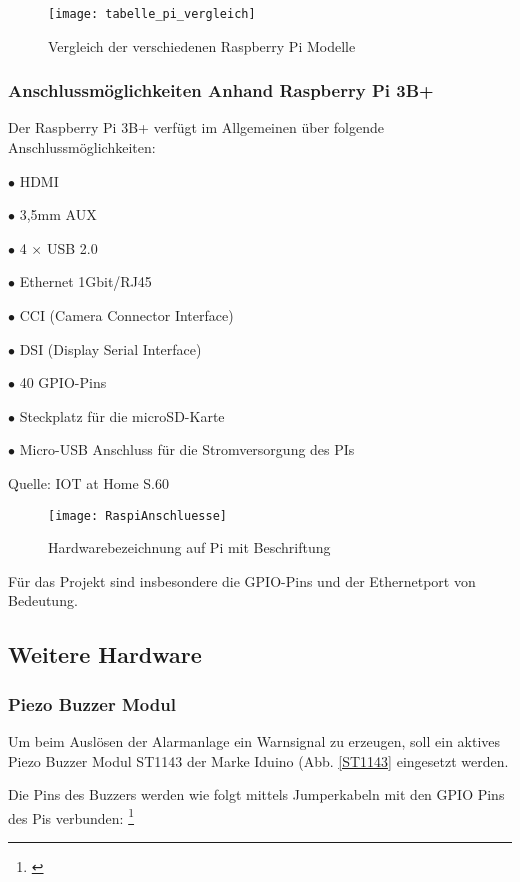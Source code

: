 \documentclass[a4paper,12pt]{article}
\begin{document}
	\begin{figure}[H]
	\centering
	\texttt{[image: tabelle\_pi\_vergleich]}
	\caption{Vergleich der verschiedenen Raspberry Pi Modelle \protect\cite[S. 59]{Huwe.2019}}
	\label{tabelle_pi_vergleich}
\end{figure}


\subsubsection{Anschlussmöglichkeiten Anhand Raspberry Pi 3B+}
Der Raspberry Pi 3B+ verfügt im Allgemeinen über folgende Anschlussmöglichkeiten:\par 
$\bullet$ HDMI   \par %
$\bullet$ 3,5mm AUX\par 
$\bullet$ 4 $\times$ USB 2.0 \par 
$\bullet$ Ethernet 1Gbit/RJ45\par 
$\bullet$ CCI (Camera Connector Interface)\par 
$\bullet$  DSI (Display Serial Interface)\par
$\bullet$ 40 GPIO-Pins\par
$\bullet$ Steckplatz für die microSD-Karte\par
$\bullet$ Micro-USB Anschluss für die Stromversorgung des PIs\par
Quelle: IOT at Home S.60\par

	\begin{figure}[H]
		\centering
		\texttt{[image: RaspiAnschluesse]}
		\caption{Hardwarebezeichnung auf Pi mit Beschriftung}
		\label{RaspiAnschluesse}
	\end{figure}
	
Für das Projekt sind insbesondere die GPIO-Pins und der Ethernetport von Bedeutung.\par

\subsection{Weitere Hardware}
\subsubsection{Piezo Buzzer Modul}
	Um beim Auslösen der Alarmanlage ein Warnsignal zu erzeugen, soll ein aktives Piezo Buzzer Modul ST1143 der Marke Iduino (Abb. \ref{ST1143} eingesetzt werden.\par Die Pins des Buzzers werden wie folgt mittels Jumperkabeln mit den GPIO Pins des Pis verbunden: \footnote{\cite{Draeger.2019}}
	
\end{document}
